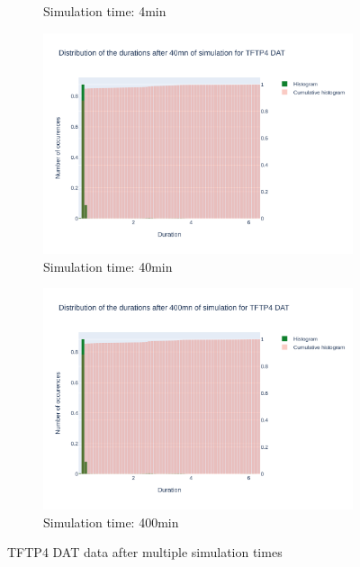 \documentclass{article}
\begin{document}
\begin{figure}[H]
\begin{subfigure}{.495\textwidth}
        \caption{Simulation time: 4min}
        \vspace{.5cm}
    \end{subfigure}
    \begin{subfigure}{.495\textwidth}
        \centering
        \includegraphics[width=\textwidth]{../fig/data/TFTP4 DAT_40mn.png}
        \caption{Simulation time: 40min}
    \end{subfigure}
    \begin{subfigure}{.495\textwidth}
        \centering
        \includegraphics[width=\textwidth]{../fig/data/TFTP4 DAT_400mn.png}
        \caption{Simulation time: 400min}
    \end{subfigure}
    \caption{TFTP4 DAT data after multiple simulation times}
\end{figure}
\end{document}
